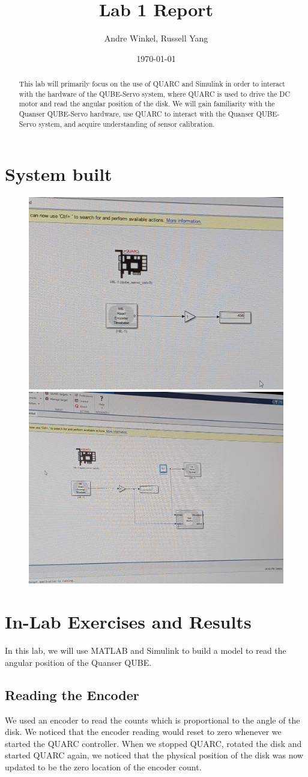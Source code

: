 \documentclass[letterpaper, 10 pt,onecolumn]{article}
\title{Lab 1 Report}
\author{Andre Winkel, Russell Yang}
\date{\today}
\begin{document}
\maketitle

\begin{abstract}
This lab will primarily focus on the use of QUARC and Simulink in order to interact with the hardware of the QUBE-Servo system, where QUARC is used to drive the DC motor and read the angular position of the disk. We will gain familiarity with the Quanser QUBE-Servo hardware, use QUARC to interact with the Quanser QUBE-Servo system, and acquire understanding of sensor calibration.
\end{abstract}

\section{System built}

\begin{figure} [H]
    \centering
    \includegraphics[width=0.4\linewidth]{1.jpg}
    \includegraphics[width=0.4\linewidth]{2.jpg}
\end{figure}

\section{In-Lab Exercises and Results}
In this lab, we will use MATLAB and Simulink to build a model to read the angular position of the Quanser QUBE. 


\subsection{Reading the Encoder}
We used an encoder to read the counts which is proportional to the angle of the disk. We noticed that the encoder reading would reset to zero whenever we started the QUARC controller. When we stopped QUARC, rotated the disk and started QUARC again, we noticed that the physical position of the disk was now updated to be the zero location of the encoder count.
\end{document}
